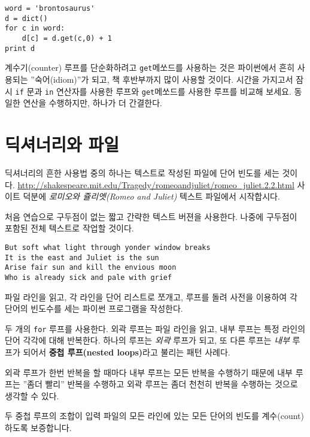 \beforeverb
\begin{verbatim}
word = 'brontosaurus'
d = dict()
for c in word:
    d[c] = d.get(c,0) + 1
print d
\end{verbatim}
\afterverb
%

계수기(counter) 루프를 단순화하려고 {\tt get}메쏘드를 사용하는 것은 파이썬에서 흔히 사용되는 ''숙어(idiom)''가 되고, 책 후반부까지 많이 사용할 것이다.
시간을 가지고서 잠시 {\tt if} 문과 {\tt in} 연산자를 사용한 루프와 {\tt get}메쏘드를 사용한 루프를 비교해 보세요.
동일한 연산을 수행하지만, 하나가 더 간결한다.


\section{딕셔너리와 파일}

딕셔너리의 흔한 사용법 중의 하나는 텍스트로 작성된 파일에 단어 빈도를 세는 것이다. 
\url{http://shakespeare.mit.edu/Tragedy/romeoandjuliet/romeo_juliet.2.2.html} 사이트 덕분에 
\emph{로미오와 쥴리엣(Romeo and Juliet)} 텍스트 파일에서 시작합시다.

처음 연습으로 구두점이 없는 짧고 간략한 텍스트 버젼을 사용한다. 
나중에 구두점이 포함된 전체 텍스트로 작업할 것이다.

\beforeverb
\begin{verbatim}
But soft what light through yonder window breaks
It is the east and Juliet is the sun
Arise fair sun and kill the envious moon
Who is already sick and pale with grief
\end{verbatim}
\afterverb
%

파일 라인을 읽고, 각 라인을 단어 리스트로 쪼개고, 루프를 돌려 사전을 이용하여 각 단어의 빈도수를 세는 파이썬 프로그램을 작성한다.


두 개의 {\tt for} 루프를 사용한다. 
외곽 루프는 파일 라인을 읽고, 내부 루프는 특정 라인의 단어 각각에 대해 반복한다.
하나의 루프는 \emph{외곽} 루프가 되고, 또 다른 루프는 \emph{내부} 루프가 되어서 {\bf 중첩 루프(nested loops)}라고 불리는 패턴 사례다.

외곽 루프가 한번 반복을 할 때마다 내부 루프는 모든 반복을 수행하기 때문에 내부 루프는 ''좀더 빨리'' 반복을 수행하고 외곽 루프는 
좀더 천천히 반복을 수행하는 것으로 생각할 수 있다.


두 중첩 루프의 조합이 입력 파일의 모든 라인에 있는 모든 단어의 빈도를 계수(count)하도록 보증합니다.

